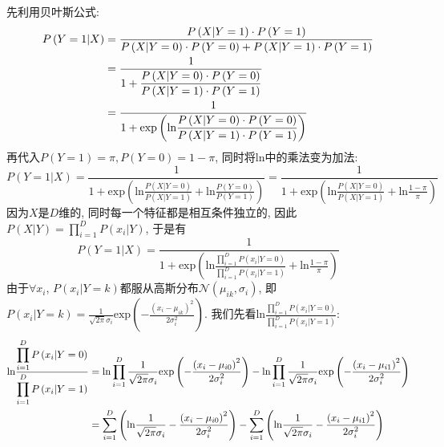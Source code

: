 \documentclass{article}
\begin{document}
\begin{homeworkProblem}
	\solution 先利用贝叶斯公式:
	\begin{align}
		P\left( Y=1|X \right) &=\frac{P\left( X|Y=1 \right) \cdot P\left( Y=1 \right)}{P\left( X|Y=0 \right) \cdot P\left( Y=0 \right) +P\left( X|Y=1 \right) \cdot P\left( Y=1 \right)} \notag
		\\
		&=\frac{1}{\displaystyle 1+\frac{P\left( X|Y=0 \right) \cdot P\left( Y=0 \right)}{P\left( X|Y=1 \right) \cdot P\left( Y=1 \right)}} \notag
		\\
		&=\frac{1}{\displaystyle 1+\text{exp} \left( \text{ln} \frac{P\left( X|Y=0 \right) \cdot P\left( Y=0 \right)}{P\left( X|Y=1 \right) \cdot P\left( Y=1 \right)} \right)} \notag
	\end{align}
	再代入$P(Y=1)=\pi,P(Y=0)=1-\pi$, 同时将$\text{ln}$中的乘法变为加法:
	$$
	P\left( Y=1|X \right) =\frac{1}{\displaystyle 1+\text{exp} \left( \text{ln} \frac{P\left( X|Y=0 \right)}{P\left( X|Y=1 \right)}+\text{ln} \frac{P\left( Y=0 \right)}{P\left( Y=1 \right)} \right)}=\frac{1}{\displaystyle 1+\text{exp} \left( \text{ln} \frac{P\left( X|Y=0 \right)}{P\left( X|Y=1 \right)}+\text{ln} \frac{1-\pi}{\pi} \right)}
	$$
	因为$X$是$D$维的, 同时每一个特征都是相互条件独立的, 因此$\displaystyle P\left( X|Y \right) =\prod_{i=1}^D{P\left( x_i|Y \right)}$, 于是有
	$$
	P\left( Y=1|X \right) =\frac{1}{1+\text{exp} \left(\displaystyle  \text{ln} \frac{\displaystyle \prod_{i=1}^D{P\left( x_i|Y=0 \right)}}{\displaystyle \prod_{i=1}^D{P\left( x_i|Y=1 \right)}}+\text{ln} \frac{1-\pi}{\pi} \right)}
	$$
	由于$\forall x_i$, $P(x_i|Y=k)$都服从高斯分布$\mathcal{N}(\mu_{ik},\sigma_i)$, 即$\displaystyle P\left( x_i|Y=k \right) =\frac{1}{\sqrt{2\pi}\sigma _i}\text{exp} \left( -\frac{\left( x_i-\mu _{ik} \right) ^2}{2\sigma _{i}^{2}} \right) 	$. 我们先看$\text{ln} \frac{\displaystyle \prod_{i=1}^D{P\left( x_i|Y=0 \right)}}{\displaystyle \prod_{i=1}^D{P\left( x_i|Y=1 \right)}}$:
	\begin{align}
		\text{ln} \frac{\displaystyle \prod_{i=1}^D{P\left( x_i|Y=0 \right)}}{\displaystyle \prod_{i=1}^D{P\left( x_i|Y=1 \right)}}&=\text{ln} \prod_{i=1}^D{\frac{1}{\sqrt{2\pi}\sigma _i}\text{exp} \left( -\frac{\left( x_i-\mu _{i0} \right) ^2}{2\sigma _{i}^{2}} \right)}-\text{ln} \prod_{i=1}^D{\frac{1}{\sqrt{2\pi}\sigma _i}\text{exp} \left( -\frac{\left( x_i-\mu _{i1} \right) ^2}{2\sigma _{i}^{2}} \right)} \notag
		\\
		&=\sum_{i=1}^D{\left( \text{ln} \frac{1}{\sqrt{2\pi}\sigma _i}-\frac{\left( x_i-\mu _{i0} \right) ^2}{2\sigma _{i}^{2}} \right)}-\sum_{i=1}^D{\left( \text{ln} \frac{1}{\sqrt{2\pi}\sigma _i}-\frac{\left( x_i-\mu _{i1} \right) ^2}{2\sigma _{i}^{2}} \right)} \notag

\end{align}
\end{homeworkProblem}
\end{document}
